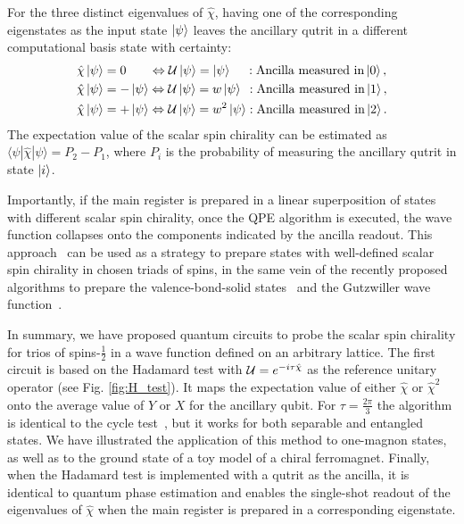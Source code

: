 \documentclass[aps,prl,twocolumn]{revtex4}
\begin{document}
For the three distinct eigenvalues of $\hat{\chi}$, having one of the corresponding eigenstates as the input state $\ket{\psi}$ leaves the ancillary qutrit in a different computational basis state with certainty:
\begin{equation*}
    \begin{aligned}
    & \hat{\chi} \ket{\psi} = 0 \quad \; \; \; \Leftrightarrow \mathcal{U} \ket{\psi} = \ket{\psi} \quad \; : \textrm{Ancilla measured in} \ket{0}, \\
    & \hat{\chi} \ket{\psi} = - \ket{\psi} \Leftrightarrow \mathcal{U} \ket{\psi} = w \ket{\psi} \; \, : \textrm{Ancilla measured in} \ket{1}, \\
    & \hat{\chi} \ket{\psi} = + \ket{\psi} \Leftrightarrow \mathcal{U} \ket{\psi} = w^2 \ket{\psi} : \textrm{Ancilla measured in} \ket{2}.
    \end{aligned}
\end{equation*}
The expectation value of the scalar spin chirality can be estimated as $\langle \psi | \hat{\chi} | \psi \rangle = P_2 - P_1$, where $P_i$ is the probability of measuring the ancillary qutrit in state $\ket{i}$.  

Importantly, if the main register is prepared in a linear superposition of states with different scalar spin chirality, once the QPE algorithm is executed, the wave function collapses onto the components indicated by the ancilla readout. This approach~\cite{lacroix20} can be used as a strategy to prepare states with well-defined scalar spin chirality in chosen triads of spins, in the same vein of the recently proposed algorithms to prepare the valence-bond-solid states~\cite{murta23} and the Gutzwiller wave function~\cite{murta21}. 

In summary, we have proposed quantum circuits to probe the scalar spin chirality for trios of spins-$\frac{1}{2}$ in a wave function defined on an arbitrary lattice. The first circuit is based on the Hadamard test with ${\cal U}=e^{-i \tau \hat{\chi}}$ as the reference unitary operator (see Fig. \ref{fig:H_test}). It maps the expectation value of either $\hat{\chi}$ or $\hat{\chi}^2$ onto the average value of $Y$ or $X$ for the ancillary qubit. For $\tau=\frac{2\pi}{3}$ the algorithm is identical to the cycle test~\cite{oszmaniec21}, but it works for both separable and entangled states. We have illustrated the application of this method to one-magnon states, as well as to the ground state of a toy model of a chiral ferromagnet. Finally, when the Hadamard test is implemented with a qutrit as the ancilla, it is identical to quantum phase estimation and enables the single-shot readout of the eigenvalues of $\hat{\chi}$ when the main register is prepared in a corresponding eigenstate. 
\end{document}
